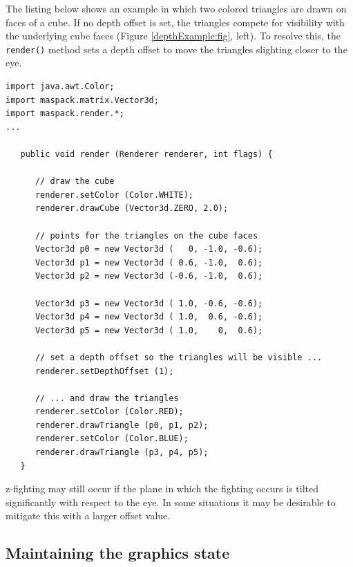 The listing below shows an example in which two colored triangles are
drawn on faces of a cube. If no depth offset is set, the triangles
compete for visibility with the underlying cube faces (Figure
\ref{depthExample:fig}, left). To resolve this, the {\tt render()}
method sets a depth offset to move the triangles slighting closer to
the eye.
%
\begin{lstlisting}[]
import java.awt.Color;
import maspack.matrix.Vector3d;
import maspack.render.*;
...

   public void render (Renderer renderer, int flags) {
   
      // draw the cube
      renderer.setColor (Color.WHITE);
      renderer.drawCube (Vector3d.ZERO, 2.0);
   
      // points for the triangles on the cube faces
      Vector3d p0 = new Vector3d (   0, -1.0, -0.6);
      Vector3d p1 = new Vector3d ( 0.6, -1.0,  0.6);
      Vector3d p2 = new Vector3d (-0.6, -1.0,  0.6);
   
      Vector3d p3 = new Vector3d ( 1.0, -0.6, -0.6);
      Vector3d p4 = new Vector3d ( 1.0,  0.6, -0.6);
      Vector3d p5 = new Vector3d ( 1.0,    0,  0.6);
   
      // set a depth offset so the triangles will be visible ...
      renderer.setDepthOffset (1);
   
      // ... and draw the triangles
      renderer.setColor (Color.RED);
      renderer.drawTriangle (p0, p1, p2);
      renderer.setColor (Color.BLUE);
      renderer.drawTriangle (p3, p4, p5);
   }
\end{lstlisting}
%
\begin{sideblock}
z-fighting may still occur if the plane in which the fighting occurs
is tilted significantly with respect to the eye.  In some situations
it may be desirable to mitigate this with a larger offset value.
\end{sideblock}

\subsection{Maintaining the graphics state}

